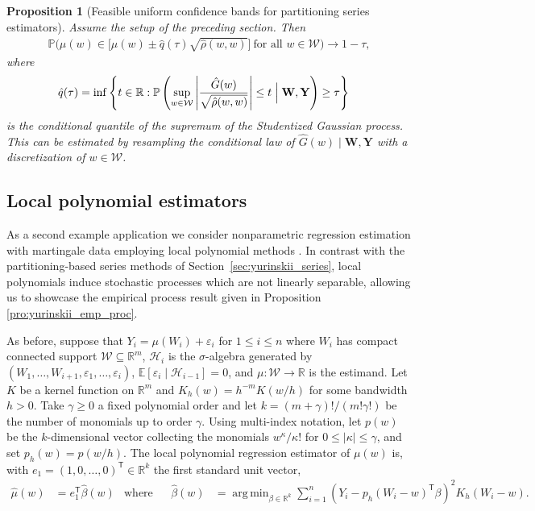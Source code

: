 \documentclass[11pt,lof]{puthesis}
\renewcommand{\P}{\ensuremath{\mathbb{P}}}
\newcommand{\R}{\ensuremath{\mathbb{R}}}
\newcommand{\E}{\ensuremath{\mathbb{E}}}
\newcommand{\bW}{\ensuremath{\mathbf{W}}}
\newcommand{\bY}{\ensuremath{\mathbf{Y}}}
\newcommand{\cH}{\ensuremath{\mathcal{H}}}
\newcommand{\cW}{\ensuremath{\mathcal{W}}}
\newcommand{\T}{\ensuremath{\mathsf{T}}}
\DeclareMathOperator*{\argmin}{arg\,min}
\theoremstyle{break}
\newtheorem{proposition}{Proposition}[section]
\theoremstyle{proof}
\begin{document}
\begin{proposition}[Feasible uniform confidence bands for partitioning
  series estimators]%
  \label{pro:yurinskii_series_feasible}
  Assume the setup of the preceding section. Then
  \begin{align*}
    \P\Big(
      \mu(w) \in
      \Big[
        \hat\mu(w) \pm \hat q(\tau)
        \sqrt{\hat\rho(w,w)}
      \Big]
      \ \text{for all }
    w \in \cW \Big)
    \to 1-\tau,
  \end{align*}
  where
  \begin{align*}
    \hat{q}(\tau)
    &=
    \inf
    \left\{
      t \in \R:
      \P\left(
        \sup_{w \in \cW}
        \left|
          \frac{\hat G(w)}{\sqrt{\hat\rho(w,w)}}
        \right|
        \leq t
        \Bigm| \bW, \bY
      \right)
      \geq \tau
    \right\}
  \end{align*}
  is the conditional quantile of the supremum of the Studentized Gaussian
  process. This can be estimated by resampling the conditional law of
  $\hat G(w) \mid \bW, \bY$ with a discretization of $w \in \cW$.
\end{proposition}

\subsection{Local polynomial estimators}
\label{sec:yurinskii_local_poly}

As a second example application we consider nonparametric regression estimation
with martingale data employing local polynomial methods
\citep{fan1996local}. In contrast with the partitioning-based series
methods of Section~\ref{sec:yurinskii_series}, local polynomials induce
stochastic
processes which are not linearly separable, allowing us to showcase the
empirical process result given in Proposition \ref{pro:yurinskii_emp_proc}.

As before, suppose that
$Y_i = \mu(W_i) + \varepsilon_i$
for $ 1 \leq i \leq n$
where $W_i$ has compact connected support $\cW \subseteq \R^m$,
$\cH_i$ is the $\sigma$-algebra generated by
$(W_1, \ldots, W_{i+1}, \varepsilon_1, \ldots, \varepsilon_i)$,
$\E[\varepsilon_i \mid \cH_{i-1}] = 0$,
and $\mu: \cW \to \R$ is the estimand. Let $K$ be a kernel function on $\R^m$
and $K_h(w) = h^{-m} K(w/h)$ for some bandwidth $h > 0$.
Take $\gamma \geq 0$ a fixed polynomial order and let
$k = (m+\gamma)!/(m!\gamma!)$ be the number of monomials up to order $\gamma$.
Using multi-index notation,
let $p(w)$ be the $k$-dimensional vector
collecting the monomials $w^{\kappa}/\kappa!$
for $0 \leq |\kappa| \leq \gamma$,
and set $p_h(w) = p(w/h)$.
The local polynomial regression estimator of $\mu(w)$ is,
with $e_1 = (1, 0, \ldots, 0)^\T \in \R^k$ the first standard unit vector,
%
\begin{align*}
  \hat{\mu}(w)
  &=
  e_1^\T\hat{\beta}(w)
  &\text{where} &
  &\hat{\beta}(w)
  &=
  \argmin_{\beta \in \R^{k}}
  \sum_{i=1}^n
  \left(Y_i - p_h(W_i-w)^\T \beta \right)^2
  K_h(W_i-w).
\end{align*}
\end{document}
